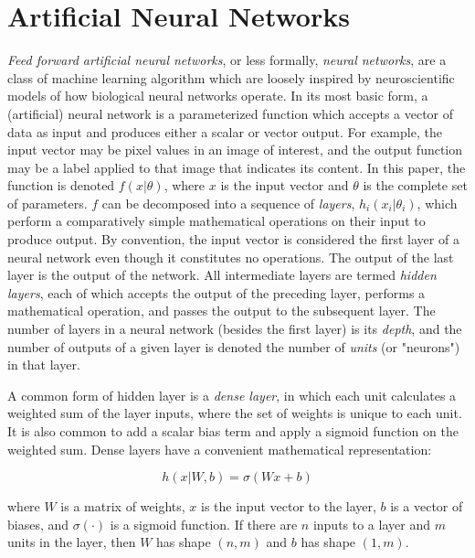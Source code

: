 \section{Artificial Neural Networks}

\textit{Feed forward artificial neural networks}, or less formally, \textit{neural networks}, are a class of machine learning algorithm which are loosely inspired by neuroscientific models of how biological neural networks operate. 
In its most basic form, a (artificial) neural network is a parameterized function which accepts a vector of data as input and produces either a scalar or vector output.
For example, the input vector may be pixel values in an image of interest, and the output function may be a label applied to that image that indicates its content.
In this paper, the function is denoted $f(x|\theta)$, where $x$ is the input vector and $\theta$ is the complete set of parameters.
$f$ can be decomposed into a sequence of \textit{layers}, $h_i(x_i|\theta_i)$, which perform a comparatively simple mathematical operations on their input to produce output.
By convention, the input vector is considered the first layer of a neural network even though it constitutes no operations. 
The output of the last layer is the output of the network. 
All intermediate layers are termed \textit{hidden layers}, each of which accepts the output of the preceding layer, performs a mathematical operation, and passes the output to the subsequent layer.
The number of layers in a neural network (besides the first layer) is its \textit{depth}, and the number of outputs of a given layer is denoted the number of \textit{units} (or "neurons") in that layer.

A common form of hidden layer is a \textit{dense layer}, in which each unit calculates a weighted sum of the layer inputs, where the set of weights is unique to each unit.
It is also common to add a scalar bias term and apply a sigmoid function on the weighted sum.
Dense layers have a convenient mathematical representation:

\begin{equation}
h(x|W, b)=\sigma(W x + b)
\label{eq:denselayer}
\end{equation}

where $W$ is a matrix of weights, $x$ is the input vector to the layer, $b$ is a vector of biases, and $\sigma(\cdot)$ is a sigmoid function.
If there are $n$ inputs to a layer and $m$ units in the layer, then $W$ has shape $(n,m)$ and $b$ has shape $(1,m)$.

